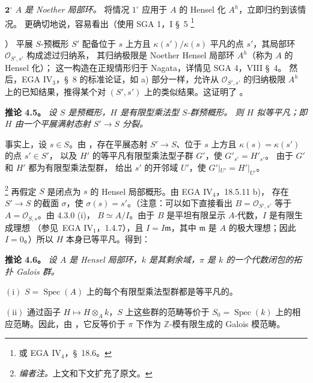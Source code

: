 \par\smallskip\noindent
\(\mathbf{2^\circ}\) \emph{\(A\) 是 Noether 局部环。}
将情况 \(1^\circ\) 应用于 \(A\) 的 Hensel 化 \(A^h\)，立即归约到该情况。
更确切地说，容易看出（使用 SGA 1，I \S~5%
\begingroup
\renewcommand{\thefootnote}{\(\ast\)}
\footnote{或 EGA IV\(_4\)，\S~18.6。}
\addtocounter{footnote}{-1}
\endgroup）
平展 \(S\)-预概形 \(S'\) 配备位于 \(s\) 上方且 \(\kappa(s')/\kappa(s)\)
平凡的点 \(s'\)，其局部环 \(\mathcal O_{S',s'}\) 构成滤过归纳系，
其归纳极限是 Noether Hensel 局部环 \(A^h\)（称为 \(A\) 的 Hensel 化）；
这一构造在正规情形归于 Nagata，详情见 SGA 4，VIII \S~4。
然后，EGA IV\(_3\)，\S~8 的标准论证，如 a) 部分一样，允许从
\(\mathcal O_{S',s'}\) 的归纳极限 \(A^h\) 上的已知结果，推得某个对
\((S',s')\) 上的类似结果。这证明了 。

\par\medskip\noindent
\textbf{推论 4.5。}\enspace
\emph{设 \(S\) 是预概形，\(H\) 是有限型乘法型 \(S\)-群预概形。
则 \(H\) 拟等平凡；即 \(H\) 由一个平展满射态射 \(S'\to S\) 分裂。}

事实上，设 \(s\in S\)。由 ，存在平展态射
\(S'\to S\)、位于 \(s\) 上方且 \(\kappa(s)=\kappa(s')\) 的点 \(s'\in S'\)，
以及 \(H'\) 的等平凡有限型乘法型子群 \(G'\)，使 \(G'_{s'}=H'_{s'}\)。
由于 \(G'\) 和 \(H'\) 都为有限型乘法型群，
给出 \(s'\) 的开邻域 \(U'\)，使 \(G'|_{U'}=H'|_{U'}\)。

\footnote{\textit{编者注。}上文和下文扩充了原文。}
再假定 \(S\) 是闭点为 \(s\) 的 Hensel 局部概形。由 EGA IV\(_4\)，18.5.11 b)，
存在 \(S'\to S\) 的截面 \(\sigma\)，使 \(\sigma(s)=s'\)。（注意：可以如下直接看出
\(B=\mathcal O_{S',s'}\) 等于 \(A=\mathcal O_{S,s}\)。由 4.3.0 (i)，
\(B\simeq A/I\)。由于 \(B\) 是平坦有限呈示 \(A\)-代数，\(I\) 是有限生成理想
（参见\ EGA IV\(_1\)，1.4.7），且 \(I=I\mathfrak m\)，其中 \(\mathfrak m\)
是 \(A\) 的极大理想；因此 \(I=0\)。）所以 \(H\) 本身已等平凡。得到：

\par\medskip\noindent
\textbf{推论 4.6。}\enspace
\begingroup\itshape
设 \(A\) 是 Hensel 局部环，\(k\) 是其剩余域，\(\pi\) 是 \(k\) 的一个代数闭包的拓扑 Galois 群。

\smallskip
\noindent
\(\mathrm{(i)}\) \(S=\operatorname{Spec}(A)\) 上的每个有限型乘法型群都是等平凡的。

\smallskip
\noindent
\(\mathrm{(ii)}\) 通过函子 \(H\mapsto H\otimes_A k\)，\(S\) 上这些群的范畴等价于
\(S_0=\operatorname{Spec}(k)\) 上的相应范畴。因此，由
，它反等价于 \(\pi\) 下作为
\(\mathbb Z\)-模有限生成的 Galois 模范畴。
\par\endgroup

